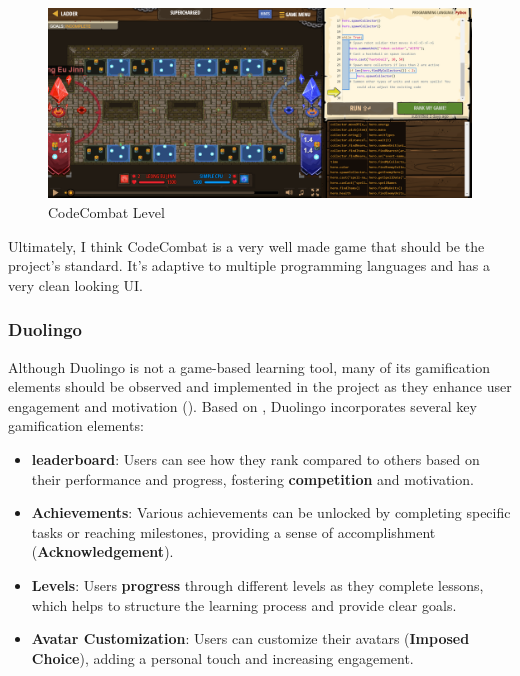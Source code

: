 \begin{figure}[H]
    \centering
    \includegraphics[width=0.5\linewidth]{images/codecombat.png}
    \caption{CodeCombat Level}
\end{figure}
Ultimately, I think CodeCombat is a very well made game that should be the project's standard. It's adaptive to multiple programming languages and has a very clean looking UI.

\subsubsection{Duolingo}
Although Duolingo is not a game-based learning tool, many of its gamification elements should be observed and implemented in the project as they enhance user engagement and motivation (\cite{mekler2017towards}). Based on \cite{toda2019analysing}, Duolingo incorporates several key gamification elements:
\begin{itemize}
    \item \textbf{leaderboard}: Users can see how they rank compared to others based on their performance and progress, fostering \textbf{competition} and motivation.
    \item \textbf{Achievements}: Various achievements can be unlocked by completing specific tasks or reaching milestones, providing a sense of accomplishment (\textbf{Acknowledgement}).
    \item \textbf{Levels}: Users \textbf{progress} through different levels as they complete lessons, which helps to structure the learning process and provide clear goals.
    \item \textbf{Avatar Customization}: Users can customize their avatars (\textbf{Imposed Choice}), adding a personal touch and increasing engagement.
\end{itemize}

